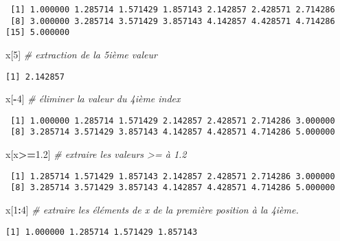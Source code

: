 \documentclass[
]{article}
\newenvironment{Shaded}{\begin{snugshade}}{\end{snugshade}}
\newcommand{\CommentTok}[1]{\textcolor[rgb]{0.56,0.35,0.01}{\textit{#1}}}
\newcommand{\DecValTok}[1]{\textcolor[rgb]{0.00,0.00,0.81}{#1}}
\newcommand{\FloatTok}[1]{\textcolor[rgb]{0.00,0.00,0.81}{#1}}
\newcommand{\NormalTok}[1]{#1}
\newcommand{\OperatorTok}[1]{\textcolor[rgb]{0.81,0.36,0.00}{\textbf{#1}}}
\begin{document}
\begin{verbatim}
 [1] 1.000000 1.285714 1.571429 1.857143 2.142857 2.428571 2.714286
 [8] 3.000000 3.285714 3.571429 3.857143 4.142857 4.428571 4.714286
[15] 5.000000
\end{verbatim}

\begin{Shaded}
\begin{Highlighting}[]
\NormalTok{x[}\DecValTok{5}\NormalTok{] }\CommentTok{# extraction de la 5ième valeur}
\end{Highlighting}
\end{Shaded}

\begin{verbatim}
[1] 2.142857
\end{verbatim}

\begin{Shaded}
\begin{Highlighting}[]
\NormalTok{x[}\OperatorTok{-}\DecValTok{4}\NormalTok{] }\CommentTok{# éliminer la valeur du 4ième index}
\end{Highlighting}
\end{Shaded}

\begin{verbatim}
 [1] 1.000000 1.285714 1.571429 2.142857 2.428571 2.714286 3.000000
 [8] 3.285714 3.571429 3.857143 4.142857 4.428571 4.714286 5.000000
\end{verbatim}

\begin{Shaded}
\begin{Highlighting}[]
\NormalTok{x[x}\OperatorTok{>=}\FloatTok{1.2}\NormalTok{] }\CommentTok{# extraire les valeurs >= à 1.2}
\end{Highlighting}
\end{Shaded}

\begin{verbatim}
 [1] 1.285714 1.571429 1.857143 2.142857 2.428571 2.714286 3.000000
 [8] 3.285714 3.571429 3.857143 4.142857 4.428571 4.714286 5.000000
\end{verbatim}

\begin{Shaded}
\begin{Highlighting}[]
\NormalTok{x[}\DecValTok{1}\OperatorTok{:}\DecValTok{4}\NormalTok{]      }\CommentTok{# extraire les éléments de x de la première position à la 4ième.}
\end{Highlighting}
\end{Shaded}

\begin{verbatim}
[1] 1.000000 1.285714 1.571429 1.857143
\end{verbatim}
\end{document}
